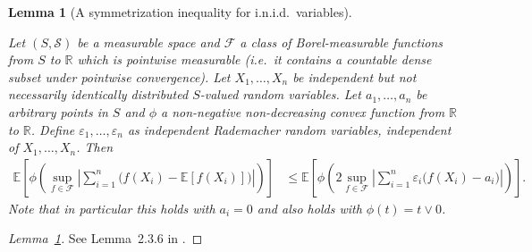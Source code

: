 \documentclass[11pt,lof]{puthesis}
\newcommand{\R}{\ensuremath{\mathbb{R}}}
\newcommand{\E}{\ensuremath{\mathbb{E}}}
\newcommand{\cF}{\ensuremath{\mathcal{F}}}
\newcommand{\cS}{\ensuremath{\mathcal{S}}}
\theoremstyle{break}
\newtheorem{lemma}{Lemma}[section]
\theoremstyle{proof}
\newtheorem{proof}{Proof}
\begin{document}
\begin{lemma}[A symmetrization inequality for i.n.i.d.\ variables]
  \label{lem:kernel_app_symmetrization}

  Let $(S, \cS)$ be a measurable space and
  $\cF$ a class of Borel-measurable functions
  from $S$ to $\R$ which is pointwise measurable
  (i.e.\ it contains a countable dense subset
  under pointwise convergence).
  Let $X_1, \ldots, X_n$
  be independent
  but not necessarily identically distributed
  $S$-valued random variables.
  Let $a_1, \ldots, a_n$ be arbitrary points in $S$
  and $\phi$ a non-negative non-decreasing convex function
  from $\R$ to $\R$.
  Define $\varepsilon_1, \ldots, \varepsilon_n$
  as independent Rademacher
  random variables,
  independent of $X_1, \ldots, X_n$.
  Then
  \begin{align*}
    \E \left[
      \phi \left(
        \sup_{f \in \cF}
        \left|
          \sum_{i=1}^n
          \Big(
            f(X_i)
            - \E[f(X_i)]
          \Big)
        \right|
      \right)
    \right]
    &\leq
    \E \left[
      \phi \left(
        2
        \sup_{f \in \cF}
        \left|
          \sum_{i=1}^n
          \varepsilon_i
          \Big(
            f(X_i)
            - a_i
          \Big)
        \right|
      \right)
    \right].
  \end{align*}
  Note that in particular this holds with $a_i = 0$
  and also holds with $\phi(t) = t \vee 0$.

\end{lemma}

\begin{proof}[Lemma~\ref{lem:kernel_app_symmetrization}]

  See Lemma~2.3.6 in
  \citet{van1996weak}.
\end{proof}
\end{document}
